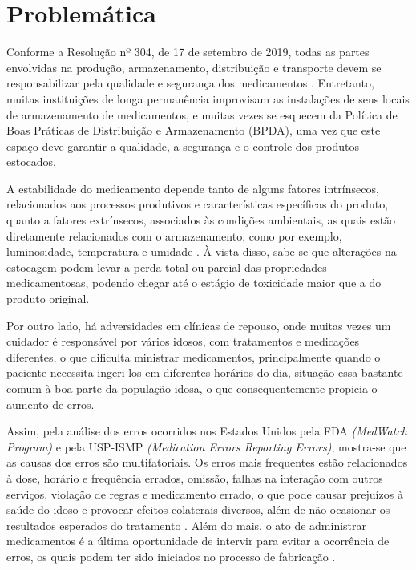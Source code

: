 \chapter[Problemática]{Problemática}

Conforme a Resolução nº 304, de 17 de setembro de 2019, todas as partes envolvidas na produção, armazenamento, distribuição e transporte devem se responsabilizar pela qualidade e segurança dos medicamentos \cite{RDC_304}. Entretanto, muitas instituições de longa permanência improvisam as instalações de seus locais de armazenamento de medicamentos,  e muitas vezes se esquecem da Política de Boas Práticas de Distribuição e Armazenamento (BPDA), uma vez que este espaço deve garantir a qualidade, a segurança e o controle dos produtos estocados.

A estabilidade do medicamento depende tanto de alguns fatores intrínsecos, relacionados aos processos produtivos e características específicas do produto, quanto a fatores extrínsecos, associados às condições ambientais, as quais estão diretamente relacionados com o armazenamento, como por exemplo, luminosidade, temperatura e umidade \cite{Souza_2018}. À vista disso, sabe-se que alterações na estocagem podem levar a perda total ou parcial das propriedades medicamentosas, podendo chegar até o estágio de toxicidade maior que a do produto original.


Por outro lado, há adversidades em clínicas de repouso, onde muitas vezes um cuidador é responsável por vários idosos, com tratamentos e medicações diferentes, o que dificulta ministrar medicamentos, principalmente quando o paciente necessita ingeri-los em diferentes horários do dia, situação essa bastante comum à boa parte da população idosa, o que consequentemente propicia o aumento de erros.


Assim, pela análise dos erros ocorridos nos Estados Unidos pela FDA \textit{(MedWatch Program)} e pela USP-ISMP \textit{(Medication Errors Reporting Errors)}, mostra-se que as causas dos erros são multifatoriais. Os erros mais frequentes estão relacionados à dose, horário e frequência errados, omissão, falhas na interação com outros serviços, violação de regras e medicamento errado, o que pode causar prejuízos à saúde do idoso e provocar efeitos colaterais diversos, além de não ocasionar os resultados esperados do tratamento \cite{Freire_2009}. Além do mais, o ato de administrar medicamentos é a última oportunidade de intervir para evitar a ocorrência de erros, os quais podem ter sido iniciados no processo de fabricação \cite{Azevedo_2011}.

